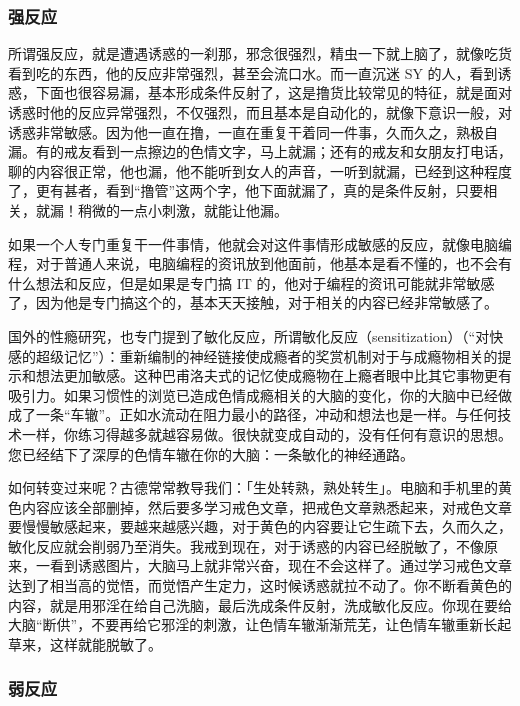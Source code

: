 \documentclass{ctexart}
\begin{document}
\subsubsection{强反应}

所谓强反应，就是遭遇诱惑的一刹那，邪念很强烈，精虫一下就上脑了，就像吃货看到吃的东西，他的反应非常强烈，甚至会流口水。而一直沉迷 SY 的人，看到诱惑，下面也很容易漏，基本形成条件反射了，这是撸货比较常见的特征，就是面对诱惑时他的反应异常强烈，不仅强烈，而且基本是自动化的，就像下意识一般，对诱惑非常敏感。因为他一直在撸，一直在重复干着同一件事，久而久之，熟极自漏。有的戒友看到一点擦边的色情文字，马上就漏；还有的戒友和女朋友打电话，聊的内容很正常，他也漏，他不能听到女人的声音，一听到就漏，已经到这种程度了，更有甚者，看到“撸管”这两个字，他下面就漏了，真的是条件反射，只要相关，就漏！稍微的一点小刺激，就能让他漏。

如果一个人专门重复干一件事情，他就会对这件事情形成敏感的反应，就像电脑编程，对于普通人来说，电脑编程的资讯放到他面前，他基本是看不懂的，也不会有什么想法和反应，但是如果是专门搞 IT 的，他对于编程的资讯可能就非常敏感了，因为他是专门搞这个的，基本天天接触，对于相关的内容已经非常敏感了。

国外的性瘾研究，也专门提到了敏化反应，所谓敏化反应（sensitization）（“对快感的超级记忆”）：重新编制的神经链接使成瘾者的奖赏机制对于与成瘾物相关的提示和想法更加敏感。这种巴甫洛夫式的记忆使成瘾物在上瘾者眼中比其它事物更有吸引力。如果习惯性的浏览已造成色情成瘾相关的大脑的变化，你的大脑中已经做成了一条“车辙”。正如水流动在阻力最小的路径，冲动和想法也是一样。与任何技术一样，你练习得越多就越容易做。很快就变成自动的，没有任何有意识的思想。您已经结下了深厚的色情车辙在你的大脑：一条敏化的神经通路。

如何转变过来呢？古德常常教导我们：「生处转熟，熟处转生」。电脑和手机里的黄色内容应该全部删掉，然后要多学习戒色文章，把戒色文章熟悉起来，对戒色文章要慢慢敏感起来，要越来越感兴趣，对于黄色的内容要让它生疏下去，久而久之，敏化反应就会削弱乃至消失。我戒到现在，对于诱惑的内容已经脱敏了，不像原来，一看到诱惑图片，大脑马上就非常兴奋，现在不会这样了。通过学习戒色文章达到了相当高的觉悟，而觉悟产生定力，这时候诱惑就拉不动了。你不断看黄色的内容，就是用邪淫在给自己洗脑，最后洗成条件反射，洗成敏化反应。你现在要给大脑“断供”，不要再给它邪淫的刺激，让色情车辙渐渐荒芜，让色情车辙重新长起草来，这样就能脱敏了。

\subsubsection{弱反应}
\end{document}
